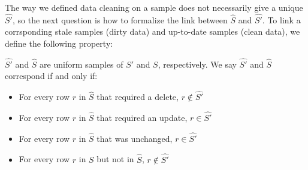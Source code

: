 The way we defined data cleaning on a sample does not necessarily give a unique $\hat{S'}$, so the next question is how to formalize the link between $\hat{S}$ and $\hat{S'}$. 
To link a corrsponding stale samples (dirty data) and up-to-date samples (clean data), we define the following property:
\begin{definition}[Correspondence]
$\hat{S'}$ and $\hat{S}$ are uniform samples of $S'$ and $S$, respectively.  We say $\hat{S'}$ and $\hat{S}$ correspond if and only if:
\begin{itemize}[noitemsep]
\item For every row $r$ in $\hat{S}$ that required a delete, $r \not\in \hat{S'}$
\item For every row $r$ in $\hat{S}$ that required an update, $r\in \hat{S'}$
\item For every row $r$ in $\hat{S}$  that was unchanged, $r \in \hat{S'}$
\item For every row $r$ in $S$ but not in $\hat{S}$, $r \not\in \hat{S'}$
\end{itemize}
\label{correspondence}
\end{definition}

